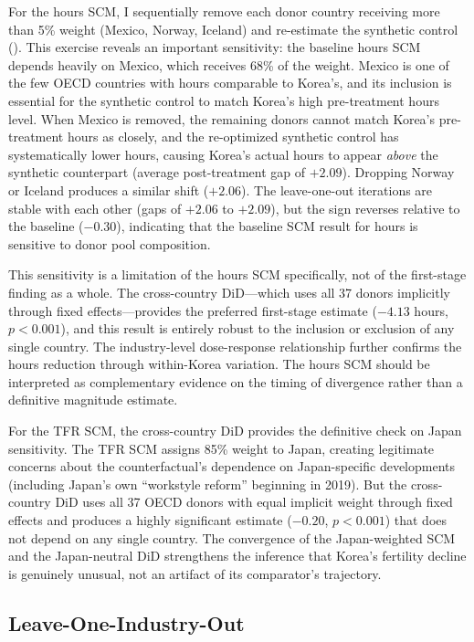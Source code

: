 \documentclass[12pt]{article}
\begin{document}
For the hours SCM, I sequentially remove each donor country receiving more than 5\% weight (Mexico, Norway, Iceland) and re-estimate the synthetic control (). This exercise reveals an important sensitivity: the baseline hours SCM depends heavily on Mexico, which receives 68\% of the weight. Mexico is one of the few OECD countries with hours comparable to Korea's, and its inclusion is essential for the synthetic control to match Korea's high pre-treatment hours level. When Mexico is removed, the remaining donors cannot match Korea's pre-treatment hours as closely, and the re-optimized synthetic control has systematically lower hours, causing Korea's actual hours to appear \textit{above} the synthetic counterpart (average post-treatment gap of $+2.09$). Dropping Norway or Iceland produces a similar shift ($+2.06$). The leave-one-out iterations are stable with each other (gaps of $+2.06$ to $+2.09$), but the sign reverses relative to the baseline ($-0.30$), indicating that the baseline SCM result for hours is sensitive to donor pool composition.

This sensitivity is a limitation of the hours SCM specifically, not of the first-stage finding as a whole. The cross-country DiD---which uses all 37 donors implicitly through fixed effects---provides the preferred first-stage estimate ($-4.13$ hours, $p < 0.001$), and this result is entirely robust to the inclusion or exclusion of any single country. The industry-level dose-response relationship further confirms the hours reduction through within-Korea variation. The hours SCM should be interpreted as complementary evidence on the timing of divergence rather than a definitive magnitude estimate.

For the TFR SCM, the cross-country DiD provides the definitive check on Japan sensitivity. The TFR SCM assigns 85\% weight to Japan, creating legitimate concerns about the counterfactual's dependence on Japan-specific developments (including Japan's own ``workstyle reform'' beginning in 2019). But the cross-country DiD uses all 37 OECD donors with equal implicit weight through fixed effects and produces a highly significant estimate ($-0.20$, $p < 0.001$) that does not depend on any single country. The convergence of the Japan-weighted SCM and the Japan-neutral DiD strengthens the inference that Korea's fertility decline is genuinely unusual, not an artifact of its comparator's trajectory.

\subsection{Leave-One-Industry-Out}
\end{document}
